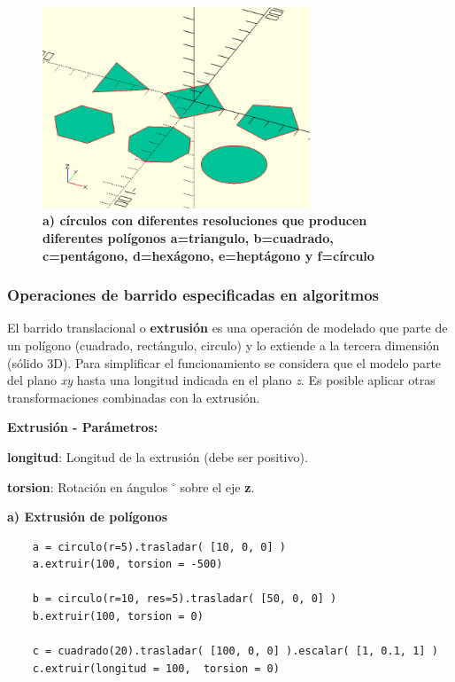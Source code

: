 \begin{figure}[h]
\includegraphics[width=8cm]{Img/Modelos/modelado18.jpg}
\centering
\caption{\textbf{\footnotesize{a) círculos con diferentes resoluciones que producen diferentes polígonos a=triangulo, b=cuadrado, c=pentágono, d=hexágono, e=heptágono y f=círculo  }}}
\end{figure}


\clearpage
\subsubsection{Operaciones de barrido especificadas en algoritmos}

El barrido translacional o \textbf{extrusión} es una operación de modelado que parte de un polígono (cuadrado, rectángulo, circulo) y lo extiende a la tercera dimensión (sólido 3D). Para simplificar el funcionamiento se considera que el modelo parte del plano \textit{xy} hasta una longitud indicada en el plano \textit{z}. Es posible aplicar otras transformaciones combinadas con la extrusión.

\begin{description}
\item  \textbf{Extrusión - Parámetros:}
\item  \textbf{longitud}: Longitud de la extrusión (debe ser positivo).
\item  \textbf{torsion}: Rotación en  ángulos $^\circ$ sobre el eje \textbf{z}.
\end{description}

\textbf{a) Extrusión de polígonos} 


\begin{listing}[ht]
\begin{verbatim}
    a = circulo(r=5).trasladar( [10, 0, 0] )
    a.extruir(100, torsion = -500)
    
    b = circulo(r=10, res=5).trasladar( [50, 0, 0] )
    b.extruir(100, torsion = 0)
    
    c = cuadrado(20).trasladar( [100, 0, 0] ).escalar( [1, 0.1, 1] )
    c.extruir(longitud = 100,  torsion = 0)
\end{verbatim}
\end{listing}

